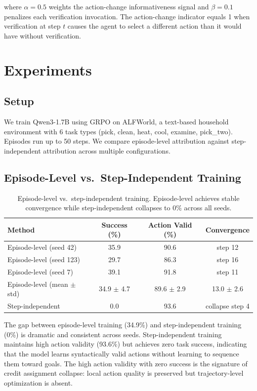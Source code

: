 \documentclass{article}
\begin{document}
where $\alpha = 0.5$ weights the action-change informativeness signal and $\beta = 0.1$ penalizes each verification invocation. The action-change indicator equals 1 when verification at step $t$ causes the agent to select a different action than it would have without verification.

\section{Experiments}

\subsection{Setup}

We train Qwen3-1.7B using GRPO on ALFWorld, a text-based household environment with 6 task types (pick, clean, heat, cool, examine, pick\_two). Episodes run up to 50 steps. We compare episode-level attribution against step-independent attribution across multiple configurations.

\subsection{Episode-Level vs.\ Step-Independent Training}

\begin{table}[h]
\centering
\caption{Episode-level vs.\ step-independent training. Episode-level achieves stable convergence while step-independent collapses to 0\% across all seeds.}
\begin{tabular}{lccc}
\toprule
Method & Success (\%) & Action Valid (\%) & Convergence \\
\midrule
Episode-level (seed 42) & 35.9 & 90.6 & step 12 \\
Episode-level (seed 123) & 29.7 & 86.3 & step 16 \\
Episode-level (seed 7) & 39.1 & 91.8 & step 11 \\
Episode-level (mean $\pm$ std) & 34.9 $\pm$ 4.7 & 89.6 $\pm$ 2.9 & 13.0 $\pm$ 2.6 \\
\midrule
Step-independent & 0.0 & 93.6 & collapse step 4 \\
\bottomrule
\end{tabular}
\label{tab:main}
\end{table}

The gap between episode-level training (34.9\%) and step-independent training (0\%) is dramatic and consistent across seeds. Step-independent training maintains high action validity (93.6\%) but achieves zero task success, indicating that the model learns syntactically valid actions without learning to sequence them toward goals. The high action validity with zero success is the signature of credit assignment collapse: local action quality is preserved but trajectory-level optimization is absent.
\end{document}
